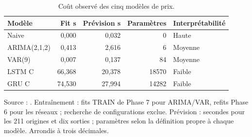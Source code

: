 \begin{table}[!htbp]
\centering
\caption{Coût observé des cinq modèles de prix.}
\label{tab:costs}
\small
\setlength{\tabcolsep}{4pt}
\renewcommand{\arraystretch}{1.16}
\begin{tabularx}{\linewidth}{XrrrX}
\toprule
\textbf{Modèle} & \textbf{Fit s} & \textbf{Prévision s} & \textbf{Paramètres} & \textbf{Interprétabilité} \\
\midrule
Naive & 0,000 & 0,032 & 0 & Haute \\
ARIMA(2,1,2) & 0,413 & 2,616 & 6 & Moyenne \\
VAR(9) & 0,007 & 0,137 & 84 & Moyenne \\
LSTM C & 66,368 & 20,378 & 18570 & Faible \\
GRU C & 74,530 & 27,994 & 14282 & Faible \\
\bottomrule
\end{tabularx}
\par\smallskip
\begin{minipage}{\linewidth}\footnotesize Source : . Entraînement : fits TRAIN de Phase 7 pour ARIMA/VAR, refits Phase 6 pour les réseaux ; recherche de configurations exclue. Prévision : secondes pour les 211 origines et dix sorties ; paramètres selon la définition propre à chaque modèle. Arrondis à trois décimales.
\end{minipage}
\end{table}
